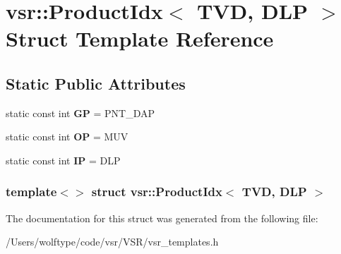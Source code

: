 \hypertarget{structvsr_1_1_product_idx_3_01_t_v_d_00_01_d_l_p_01_4}{\section{vsr\-:\-:Product\-Idx$<$ T\-V\-D, D\-L\-P $>$ Struct Template Reference}
\label{structvsr_1_1_product_idx_3_01_t_v_d_00_01_d_l_p_01_4}
}
\subsection*{Static Public Attributes}
\begin{DoxyCompactItemize}
\item 
\hypertarget{structvsr_1_1_product_idx_3_01_t_v_d_00_01_d_l_p_01_4_a294f2e66bb72082165d2fc04a024a60e}{static const int {\bfseries G\-P} = P\-N\-T\-\_\-\-D\-A\-P}\label{structvsr_1_1_product_idx_3_01_t_v_d_00_01_d_l_p_01_4_a294f2e66bb72082165d2fc04a024a60e}

\item 
\hypertarget{structvsr_1_1_product_idx_3_01_t_v_d_00_01_d_l_p_01_4_a0198725f847402ddabe795913e016343}{static const int {\bfseries O\-P} = M\-U\-V}\label{structvsr_1_1_product_idx_3_01_t_v_d_00_01_d_l_p_01_4_a0198725f847402ddabe795913e016343}

\item 
\hypertarget{structvsr_1_1_product_idx_3_01_t_v_d_00_01_d_l_p_01_4_aee81f3e0b9c735d368c478481bee3fa2}{static const int {\bfseries I\-P} = D\-L\-P}\label{structvsr_1_1_product_idx_3_01_t_v_d_00_01_d_l_p_01_4_aee81f3e0b9c735d368c478481bee3fa2}

\end{DoxyCompactItemize}
\subsubsection*{template$<$$>$ struct vsr\-::\-Product\-Idx$<$ T\-V\-D, D\-L\-P $>$}



The documentation for this struct was generated from the following file\-:\begin{DoxyCompactItemize}
\item 
/\-Users/wolftype/code/vsr/\-V\-S\-R/vsr\-\_\-templates.\-h\end{DoxyCompactItemize}
